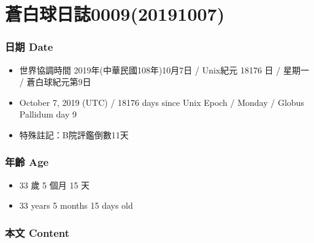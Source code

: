 \documentclass[a5paper, 12pt
]{book}
\providecommand{\tightlist}{%
  \setlength{\itemsep}{0pt}\setlength{\parskip}{0pt}}
\begin{document}
\hypertarget{ux84bcux767dux7403ux65e5ux8a8c000920191007}{%
\section{蒼白球日誌0009(20191007)}\label{ux84bcux767dux7403ux65e5ux8a8c000920191007}}

\hypertarget{ux65e5ux671f-date-6}{%
\subsubsection{日期 Date}\label{ux65e5ux671f-date-6}}

\begin{itemize}
\tightlist
\item
  世界協調時間 2019年(中華民國108年)10月7日 / Unix紀元 18176 日 / 星期一
  / 蒼白球紀元第9日
\item
  October 7, 2019 (UTC) / 18176 days since Unix Epoch / Monday / Globus
  Pallidum day 9
\item
  特殊註記：B院評鑑倒數11天
\end{itemize}

\hypertarget{ux5e74ux9f61-age-6}{%
\subsubsection{年齡 Age}\label{ux5e74ux9f61-age-6}}

\begin{itemize}
\tightlist
\item
  33 歲 5 個月 15 天
\item
  33 years 5 months 15 days old
\end{itemize}

\hypertarget{ux672cux6587-content-6}{%
\subsubsection{本文 Content}\label{ux672cux6587-content-6}}
\end{document}
